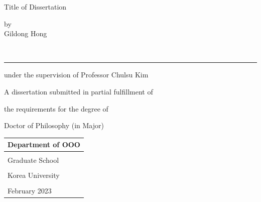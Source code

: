 \documentclass{report}
\begin{document}
\newpage 
\begin{center}
\huge Title of Dissertation %
\par\vspace{50pt}
\Large by\\
Gildong Hong %
\par\vspace{20pt}
{\small\color{gray}{student signiture}}\\[-15pt]
\rule{.6\textwidth}{0.4pt}
\par\vspace{20pt}
under the supervision of Professor Chulsu Kim %
\par\vspace{20pt}
A dissertation submitted in partial fulfillment of \par
the requirements for the degree of \par
Doctor of Philosophy (in Major) %
\par\vspace{10pt}
\end{center}
\noindent
\begin{tabularx}{\textwidth}{| >{\centering\arraybackslash}X |}
\arrayrulecolor{lgray}
\hline
\Large Department of OOO \\\hline %
\rule{0pt}{30pt}\\\hline
\LARGE Graduate School \\\hline
\\[-8pt]\hline
\LARGE Korea University \\\hline
\rule{0pt}{20pt}\\\hline
\large February 2023 \\\hline %
\end{tabularx}
\end{document}

